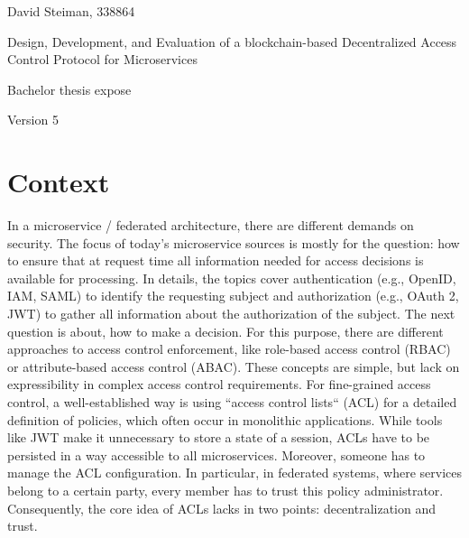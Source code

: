 \documentclass[12pt, conference]{IEEEtran}
\begin{document}
\pagestyle{empty}
\onecolumn

\clearscrheadings\clearscrplain
\begin{center}
David Steiman, 338864 \\

\vspace{8cm}

\begin{Huge}
Design, Development, and Evaluation of a blockchain-based Decentralized Access Control Protocol for Microservices \\
\end{Huge}
\begin{Large}
Bachelor thesis expose \\
\end{Large}
Version 5 \\


\end{center}
\clearpage

\twocolumn
\pagestyle{useheadings}


\section{Context}
In a microservice / federated architecture, there are different demands on security. The focus of today's microservice sources is mostly for the question: how to ensure that at request time all information needed for access decisions is available for processing. In details, the topics cover authentication (e.g., OpenID, IAM, SAML) to identify the requesting subject and authorization (e.g., OAuth 2, JWT) to gather all information about the authorization of the subject. The next question is about, how to make a decision. For this purpose, there are different approaches to access control enforcement, like role-based access control (RBAC) or attribute-based access control (ABAC). These concepts are simple, but lack on expressibility in complex access control requirements.  For fine-grained access control, a well-established way is using ``access control lists`` (ACL) for a detailed definition of policies, which often occur in monolithic applications. While tools like JWT make it unnecessary to store a state of a session, ACLs have to be persisted in a way accessible to all microservices. Moreover, someone has to manage the ACL configuration. In particular, in federated systems, where services belong to a certain party, every member has to trust this policy administrator.
Consequently, the core idea of ACLs lacks in two points: decentralization and trust.
\end{document}
